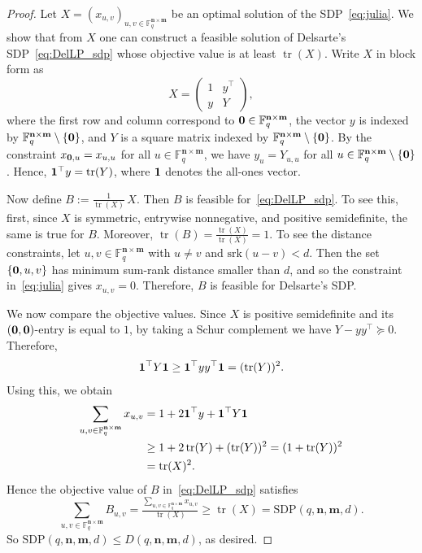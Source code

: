 \documentclass[10pt,a4paper]{amsart}
\newcommand{\Del}{D(q,\bfn,\bfm,d)}
\newcommand{\F}{\mathbb{F}}
\newcommand{\bfm}{\mathbf {m}}
\newcommand{\bfn}{\mathbf {n}}
\newcommand{\spac}{\F^{\bfn\times\bfm}_q}
\newcommand{\srk}{\mathrm{srk}}
\DeclareMathOperator{\tr}{tr}
\begin{document}
\begin{proof}
Let $X=(x_{u,v})_{u,v\in\spac}$ be an optimal solution of the SDP~\eqref{eq:julia}. We show that from $X$ one can construct a feasible solution of Delsarte's SDP~\eqref{eq:DelLP_sdp} whose objective value is at least $\tr(X)$. Write $X$ in block form as
\[
X=
\begin{pmatrix}
1 & y^\top\\
y & Y
\end{pmatrix},
\]
where the first row and column correspond to ${\bf 0}\in\spac$, the vector $y$ is indexed by $\spac\setminus\{{\bf 0}\}$, and $Y$ is a square matrix indexed by $\spac\setminus\{{\bf 0}\}$. By the constraint $x_{{\bf 0},u}=x_{u,u}$ for all $u\in\spac$, we have $y_u=Y_{u,u}$ for all $u\in\spac\setminus\{{\bf 0}\}$. Hence, ${\bf 1}^\top y=\tr(Y)$, where ${\bf 1}$ denotes the all-ones vector.

Now define $B:=\frac{1}{\tr(X)}\,X$. Then $B$ is feasible for~\eqref{eq:DelLP_sdp}. To see this, first, since $X$ is symmetric, entrywise nonnegative, and positive semidefinite, the same is true for $B$. Moreover, $\tr(B)=\frac{\tr(X)}{\tr(X)}=1$. To see the distance constraints, let $u,v\in\spac$ with $u\neq v$ and $\srk(u-v)<d$. Then the set $\{{\bf 0},u,v\}$ has minimum sum-rank distance smaller than $d$, and so the constraint in~\eqref{eq:julia} gives $x_{u,v}=0$. Therefore, $B$ is feasible for Delsarte's SDP.

We now compare the objective values. Since $X$ is positive semidefinite and its $( {\bf 0},{\bf 0})$-entry is equal to $1$, by taking a Schur complement we have $Y-yy^\top \succeq 0$. Therefore,
\[
{\bf 1}^\top Y{\bf 1}\geq {\bf 1}^\top yy^\top {\bf 1}=(\tr(Y))^2.
\]
Using this, we obtain
\begin{align*}
\sum_{u,v\in\spac} x_{u,v}
&=
1+2{\bf 1}^\top y+{\bf 1}^\top Y{\bf 1}\\
&\geq 1+2\tr(Y)+(\tr(Y))^2=(1+\tr(Y))^2\\&=\tr(X)^2.
\end{align*}
Hence the objective value of $B$ in~\eqref{eq:DelLP_sdp} satisfies $$\sum_{u,v\in\spac} B_{u,v}= \tfrac{\sum_{u,v\in\spac} x_{u,v}}{\tr(X)}
\geq \tr(X)=\mathrm{SDP}(q,\bfn,\bfm,d).$$ 
So $\mathrm{SDP}(q,\bfn,\bfm,d)\leq \Del$, as desired.
\end{proof}
\end{document}
